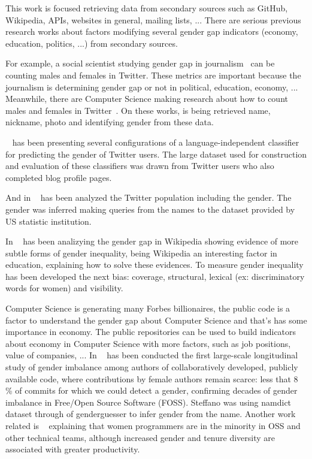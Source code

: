 \documentclass[a4paper]{article}
\begin{document}
This work is focused retrieving data from secondary sources such as
GitHub, Wikipedia, APIs, websites in general, mailing lists, ...
There are serious previous research works about factors modifying
several gender gap indicators (economy, education, politics, ...) from
secondary sources.

For example, a social scientist studying gender gap in
journalism~\cite{alvarez2012journalism} can be counting males and
females in Twitter. These metrics are important because the journalism
is determining gender gap or not in political, education, economy,
... Meanwhile, there are Computer Science making research about how to
count males and females in Twitter~\cite{burger2011discriminating}. On
these works, is being retrieved name, nickname, photo and identifying
gender from these data.

~\cite{burger2011discriminating} has been presenting several
configurations of a language-independent classifier for predicting the
gender of Twitter users. The large dataset used for construction and
evaluation of these classifiers was drawn from Twitter users who also
completed blog profile pages.

And in ~\cite{mislove2011understanding} has been analyzed the Twitter
population including the gender. The gender was inferred making queries
from the names to the dataset provided by US statistic institution.

In ~\cite{wagner2015s} has been analizying the gender gap in Wikipedia
showing evidence of more subtle forms of gender inequality, being
Wikipedia an interesting factor in education, explaining how to solve
these evidences. To measure gender inequality has been developed the
next bias: coverage, structural, lexical (ex: discriminatory words
for women) and visibility.

Computer Science is generating many Forbes billionaires, the public
code is a factor to understand the gender gap about Computer Science
and that's has some importance in economy. The public repositories can
be used to build indicators about economy in Computer Science with
more factors, such as job positions, value of companies, ... In
~\cite{zacchiroli2020gender} has been conducted the first large-scale
longitudinal study of gender imbalance among authors of
collaboratively developed, publicly available code, where
contributions by female authors remain scarce: less that 8 \% of
commits for which we could detect a gender, confirming decades of
gender imbalance in Free/Open Source Software (FOSS). Steffano was
using namdict dataset through of genderguesser to infer gender from
the name. Another work related is ~\cite{vasilescu2015gender}
explaining that women programmers are in the minority in OSS and other
technical teams, although increased gender and tenure diversity are
associated with greater productivity.
\end{document}
